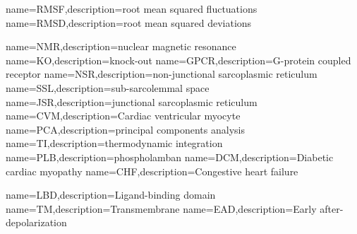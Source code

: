 \newcommand\ppi{\gls{ppi}}
\newcommand\cbp{\gls{cbp}}

\newcommand\cam{\gls{cam}}
\newcommand\cn{\gls{cn}}

\newcommand\tnc{\gls{tnc}}
\newcommand\tn{\gls{tn}}
\newcommand\tni{\gls{tni}}


{name={RMSF},description={root mean squared fluctuations}}
{name={RMSD},description={root mean squared deviations}}

{name={NMR},description={nuclear magnetic resonance}}
\newcommand{\HF}{heart failure}
{name={KO},description={knock-out}}
{name={GPCR},description={G-protein coupled receptor}}               
{name={NSR},description={non-junctional sarcoplasmic reticulum}}
{name={SSL},description={sub-sarcolemmal space}}             
{name={JSR},description={junctional sarcoplasmic reticulum}}
{name={CVM},description={Cardiac ventricular myocyte}}
{name={PCA},description={principal components analysis}}       
{name={TI},description={thermodynamic integration}}
{name={PLB},description={phospholamban}}
{name={DCM},description={Diabetic cardiac myopathy}}
{name={CHF},description={Congestive heart failure}}

{name={LBD},description={Ligand-binding domain}}
{name={TM},description={Transmembrane}}
{name={EAD},description={Early after-depolarization}}
\newcommand{\DAD}{delayed after-depolarization}

